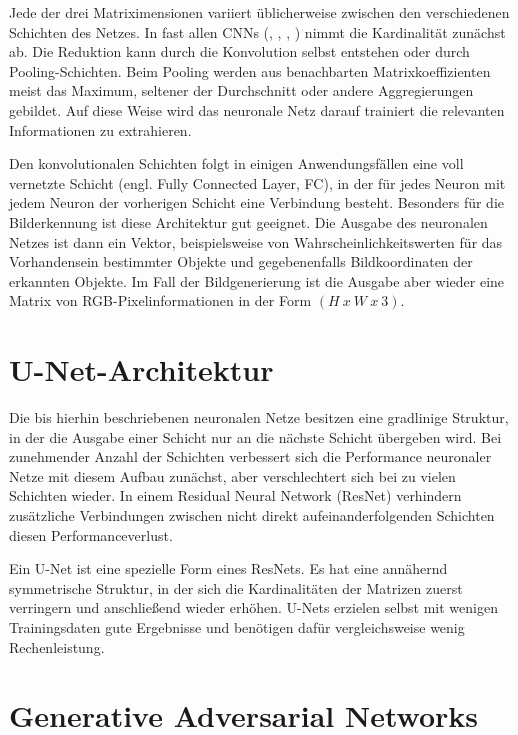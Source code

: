 Jede der drei Matriximensionen variiert üblicherweise zwischen den verschiedenen Schichten des Netzes. In fast allen CNNs (\cite{Goodfellow-et-al-2016}, \cite{Lecun99objectrecognition}, \cite{RFB15a}, \cite{isola2018imagetoimage}) nimmt die Kardinalität zunächst ab. Die Reduktion kann durch die Konvolution selbst entstehen oder durch Pooling-Schichten. Beim Pooling werden aus benachbarten Matrixkoeffizienten meist das Maximum, seltener der Durchschnitt oder andere Aggregierungen gebildet. Auf diese Weise wird das neuronale Netz darauf trainiert die relevanten Informationen zu extrahieren. \cite{Goodfellow-et-al-2016}

Den konvolutionalen Schichten folgt in einigen Anwendungsfällen eine voll vernetzte Schicht (engl. Fully Connected Layer, FC), in der für jedes Neuron mit jedem Neuron der vorherigen Schicht eine Verbindung besteht. Besonders für die Bilderkennung ist diese Architektur gut geeignet. Die Ausgabe des neuronalen Netzes ist dann ein Vektor, beispielsweise von Wahrscheinlichkeitswerten für das Vorhandensein bestimmter Objekte und gegebenenfalls Bildkoordinaten der erkannten Objekte. Im Fall der Bildgenerierung ist die Ausgabe aber wieder eine Matrix von RGB-Pixelinformationen in der Form $(H\ x\ W\ x\ 3)$.

\section{U-Net-Architektur}
\label{sec:unet}
Die bis hierhin beschriebenen neuronalen Netze besitzen eine gradlinige Struktur, in der die Ausgabe einer Schicht nur an die nächste Schicht übergeben wird. Bei zunehmender Anzahl der Schichten verbessert sich die Performance neuronaler Netze mit diesem Aufbau zunächst, aber verschlechtert sich bei zu vielen Schichten wieder. In einem Residual Neural Network (ResNet) verhindern zusätzliche Verbindungen zwischen nicht direkt aufeinanderfolgenden Schichten diesen Performanceverlust.

Ein U-Net ist eine spezielle Form eines ResNets. Es hat eine annähernd symmetrische Struktur, in der sich die Kardinalitäten der Matrizen zuerst verringern und anschließend wieder erhöhen. U-Nets erzielen selbst mit wenigen Trainingsdaten gute Ergebnisse und benötigen dafür vergleichsweise wenig Rechenleistung. \cite{he2015deep}

\section{Generative Adversarial Networks}
\label{gan}

